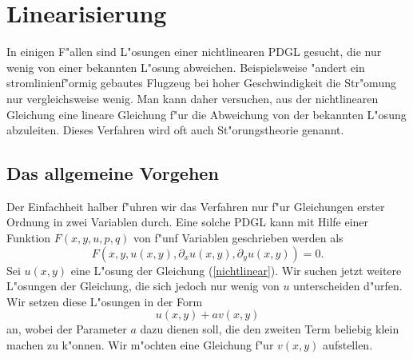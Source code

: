 \section{Linearisierung}
In einigen F"allen sind L"osungen einer nichtlinearen PDGL gesucht, die 
nur wenig von einer bekannten L"osung abweichen. Beispielsweise "andert
ein stromlinienf"ormig gebautes Flugzeug bei hoher Geschwindigkeit die
Str"omung nur vergleichsweise wenig. Man kann daher versuchen, aus der
nichtlinearen Gleichung eine lineare Gleichung f"ur die Abweichung
von der bekannten L"osung abzuleiten. Dieses Verfahren wird oft auch
St"orungstheorie genannt.

\subsection{Das allgemeine Vorgehen}
Der Einfachheit halber f"uhren wir das Verfahren nur f"ur Gleichungen
erster Ordnung in zwei Variablen durch. Eine solche PDGL kann mit Hilfe
einer Funktion $F(x,y,u,p,q)$ von f"unf Variablen geschrieben werden als
\begin{equation}
F(x,y,u(x,y), \partial_xu(x,y),\partial_yu(x,y))=0.
\label{nichtlinear}
\end{equation}
Sei $u(x,y)$ eine L"osung der Gleichung (\ref{nichtlinear}). Wir suchen
jetzt weitere L"osungen der Gleichung, die sich jedoch nur wenig von
$u$ unterscheiden d"urfen. Wir setzen diese L"osungen in der Form
\begin{equation}
u(x,y)+av(x,y)
\label{linearisierungansatz}
\end{equation}
an, wobei der Parameter $a$ dazu dienen soll, die den
zweiten Term beliebig klein machen zu k"onnen. Wir m"ochten eine Gleichung
f"ur $v(x,y)$ aufstellen.


